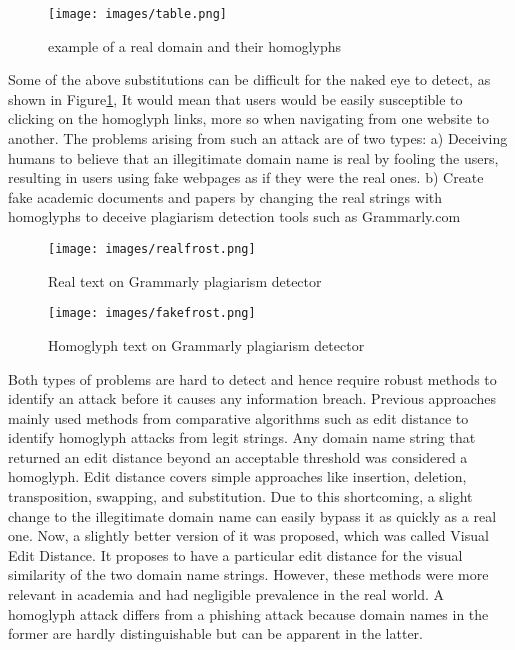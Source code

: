 \documentclass[letterpaper]{article} \usepackage{aaai22}  \usepackage{times}  \usepackage{helvet}  \usepackage{courier}  \usepackage[hyphens]{url}  \usepackage{graphicx} \urlstyle{rm} \def\UrlFont{\rm}  \usepackage{natbib}  \usepackage{caption} \DeclareCaptionStyle{ruled}{labelfont=normalfont,labelsep=colon,strut=off} \frenchspacing  \setlength{\pdfpagewidth}{8.5in}  \setlength{\pdfpageheight}{11in}  \usepackage{algorithm}
\begin{document}
\begin{figure}[ht]
    \texttt{[image: images/table.png]}
    \caption{example of a real domain and their homoglyphs}
    \label{fig:fig1}
\end{figure}

Some of the above substitutions can be difficult for the naked eye to detect, as shown in  Figure\ref{fig:fig1}, It would mean that users would be easily susceptible to clicking on the homoglyph links, more so when navigating from one website to another. The problems arising from such an attack are of two types: a) Deceiving humans to believe that an illegitimate domain name is real by fooling the users, resulting in users using fake webpages as if they were the real ones. b) Create fake academic documents and papers by changing the real strings with homoglyphs to deceive plagiarism detection tools such as Grammarly.com \\

\begin{figure}
    \texttt{[image: images/realfrost.png]}
    \caption{Real text on Grammarly plagiarism detector}
    \label{fig2}
\end{figure}

\begin{figure}
    \texttt{[image: images/fakefrost.png]}
    \caption{Homoglyph text on Grammarly plagiarism detector}
    \label{fig3}
\end{figure}


Both types of problems are hard to detect and hence require robust methods to identify an attack before it causes any information breach. Previous approaches mainly used methods from comparative algorithms such as edit distance to identify homoglyph attacks from legit strings\cite{damerau1964technique}. Any domain name string that returned an edit distance beyond an acceptable threshold was considered a homoglyph. Edit distance covers simple approaches like insertion, deletion, transposition, swapping, and substitution. Due to this shortcoming, a slight change to the illegitimate domain name can easily bypass it as quickly as a real one. Now, a slightly better version of it was proposed, which was called Visual Edit Distance\cite{ristad1998learning}. It proposes to have a particular edit distance for the visual similarity of the two domain name strings. However, these methods were more relevant in academia and had negligible prevalence in the real world. A homoglyph attack differs from a phishing attack because domain names in the former are hardly distinguishable but can be apparent in the latter.
\end{document}
